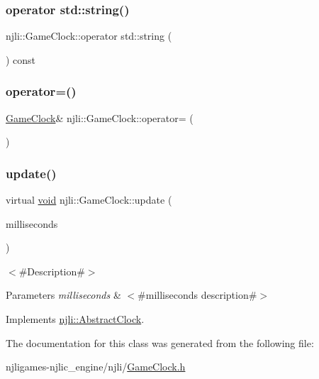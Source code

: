 \subsubsection{\texorpdfstring{operator std\+::string()}{operator std::string()}}
{\footnotesize\ttfamily njli\+::\+Game\+Clock\+::operator std\+::string (\begin{DoxyParamCaption}{ }\end{DoxyParamCaption}) const}

\mbox{\label{classnjli_1_1_game_clock_a169ce8985a8bc4adfe7cc4515538eeed}} 
\subsubsection{\texorpdfstring{operator=()}{operator=()}}
{\footnotesize\ttfamily \mbox{\hyperlink{classnjli_1_1_game_clock}{Game\+Clock}}\& njli\+::\+Game\+Clock\+::operator= (\begin{DoxyParamCaption}\item[{const \mbox{\hyperlink{classnjli_1_1_game_clock}{Game\+Clock}} \&}]{ }\end{DoxyParamCaption})\hspace{0.3cm}{\ttfamily [private]}}

\mbox{\label{classnjli_1_1_game_clock_a9eef69cf52e3b8591db5718c1c438618}} 
\subsubsection{\texorpdfstring{update()}{update()}}
{\footnotesize\ttfamily virtual \mbox{\hyperlink{_thread_8h_af1e856da2e658414cb2456cb6f7ebc66}{void}} njli\+::\+Game\+Clock\+::update (\begin{DoxyParamCaption}\item[{\mbox{\hyperlink{_util_8h_a94dab5770726ccbef8c7d026cfbdf8e5}{f64}}}]{milliseconds }\end{DoxyParamCaption})\hspace{0.3cm}{\ttfamily [virtual]}}

$<$\#\+Description\#$>$


\begin{DoxyParams}{Parameters}
{\em milliseconds} & $<$\#milliseconds description\#$>$ \\
\hline
\end{DoxyParams}


Implements \mbox{\hyperlink{classnjli_1_1_abstract_clock_a06401048780f7b9522187731d3a97579}{njli\+::\+Abstract\+Clock}}.



The documentation for this class was generated from the following file\+:\begin{DoxyCompactItemize}
\item 
njligames-\/njlic\+\_\+engine/njli/\mbox{\hyperlink{_game_clock_8h}{Game\+Clock.\+h}}\end{DoxyCompactItemize}
